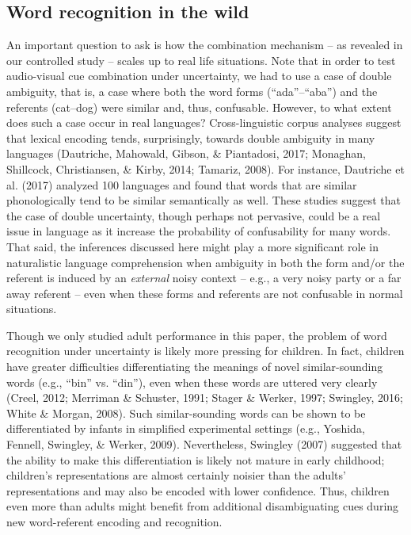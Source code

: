 \documentclass[english,floatsintext,man]{apa6}
\theoremstyle{definition}
\theoremstyle{definition}
\theoremstyle{definition}
\theoremstyle{remark}
\begin{document}
\subsection{Word recognition in the
wild}\label{word-recognition-in-the-wild}

An important question to ask is how the combination mechanism -- as
revealed in our controlled study -- scales up to real life situations.
Note that in order to test audio-visual cue combination under
uncertainty, we had to use a case of double ambiguity, that is, a case
where both the word forms (\enquote{ada}--\enquote{aba}) and the
referents (cat--dog) were similar and, thus, confusable. However, to
what extent does such a case occur in real languages? Cross-linguistic
corpus analyses suggest that lexical encoding tends, surprisingly,
towards double ambiguity in many languages (Dautriche, Mahowald, Gibson,
\& Piantadosi, 2017; Monaghan, Shillcock, Christiansen, \& Kirby, 2014;
Tamariz, 2008). For instance, Dautriche et al. (2017) analyzed 100
languages and found that words that are similar phonologically tend to
be similar semantically as well. These studies suggest that the case of
double uncertainty, though perhaps not pervasive, could be a real issue
in language as it increase the probability of confusability for many
words. That said, the inferences discussed here might play a more
significant role in naturalistic language comprehension when ambiguity
in both the form and/or the referent is induced by an \emph{external}
noisy context -- e.g., a very noisy party or a far away referent -- even
when these forms and referents are not confusable in normal situations.

Though we only studied adult performance in this paper, the problem of
word recognition under uncertainty is likely more pressing for children.
In fact, children have greater difficulties differentiating the meanings
of novel similar-sounding words (e.g., \enquote{bin} vs. \enquote{din}),
even when these words are uttered very clearly (Creel, 2012; Merriman \&
Schuster, 1991; Stager \& Werker, 1997; Swingley, 2016; White \& Morgan,
2008). Such similar-sounding words can be shown to be differentiated by
infants in simplified experimental settings (e.g., Yoshida, Fennell,
Swingley, \& Werker, 2009). Nevertheless, Swingley (2007) suggested that
the ability to make this differentiation is likely not mature in early
childhood; children's representations are almost certainly noisier than
the adults' representations and may also be encoded with lower
confidence. Thus, children even more than adults might benefit from
additional disambiguating cues during new word-referent encoding and
recognition.
\end{document}
